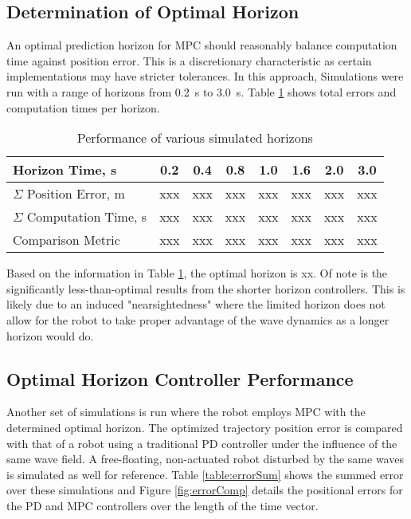 \documentclass[letterpaper, 10pt, conference]{IEEEtran}
\begin{document}
\subsection{Determination of Optimal Horizon} \label{results:optimal}

An optimal prediction horizon for MPC should reasonably balance computation time against position error. This is a discretionary characteristic as certain implementations may have stricter tolerances. In this approach, Simulations were run with a range of horizons from 0.2~s to 3.0~s. Table \ref{table:optimalHorizon} shows total errors and computation times per horizon. 

\begin{table}[h]
\caption{Performance of various simulated horizons}
\begin{center}
\def\arraystretch{1.1}%
\begin{tabular}{ |l|c|c|c|c|c|c|c| } 
 \hline 
 Horizon Time, s & 0.2 & 0.4 & 0.8 & 1.0 & 1.6 & 2.0 & 3.0 \\ 
 \hline
 $\Sigma$ Position Error, m & xxx & xxx & xxx & xxx & xxx & xxx & xxx \\ 
 $\Sigma$ Computation Time, s & xxx & xxx & xxx & xxx & xxx & xxx & xxx \\ 
 Comparison Metric & xxx & xxx & xxx & xxx & xxx & xxx & xxx\\
 \hline
\end{tabular}
\end{center}
\label{table:optimalHorizon}
\end{table}

Based on the information in Table \ref{table:optimalHorizon}, the optimal horizon is xx. Of note is the significantly less-than-optimal results from the shorter horizon controllers. This is likely due to an induced "nearsightedness" where the limited horizon does not allow for the robot to take proper advantage of the wave dynamics as a longer horizon would do. 

\subsection{Optimal Horizon Controller Performance} \label{results:perform}

Another set of simulations is run where the robot employs MPC with the determined optimal horizon. The optimized trajectory position error is compared with that of a robot using a traditional PD controller under the influence of the same wave field. A free-floating, non-actuated robot disturbed by the same waves is simulated as well for reference. Table \ref{table:errorSum} shows the summed error over these simulations and Figure \ref{fig:errorComp} details the positional errors for the PD and MPC controllers over the length of the time vector.
\end{document}
